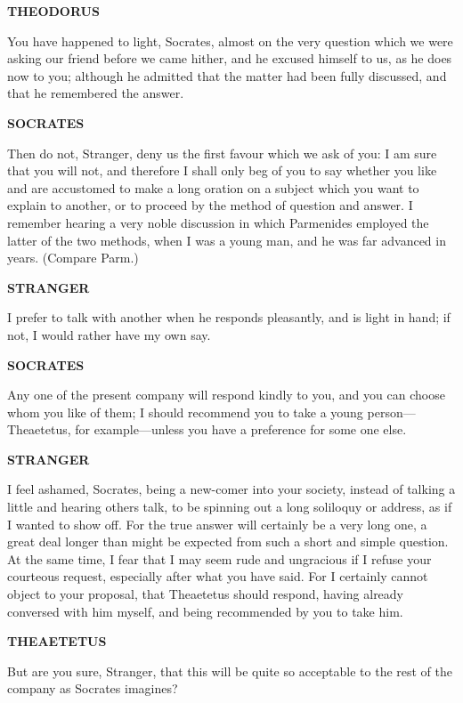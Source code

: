 \documentclass[11pt,letter]{article}
\begin{document}
\par \textbf{THEODORUS}
\par   You have happened to light, Socrates, almost on the very question which we were asking our friend before we came hither, and he excused himself to us, as he does now to you; although he admitted that the matter had been fully discussed, and that he remembered the answer.

\par \textbf{SOCRATES}
\par   Then do not, Stranger, deny us the first favour which we ask of you:  I am sure that you will not, and therefore I shall only beg of you to say whether you like and are accustomed to make a long oration on a subject which you want to explain to another, or to proceed by the method of question and answer. I remember hearing a very noble discussion in which Parmenides employed the latter of the two methods, when I was a young man, and he was far advanced in years. (Compare Parm.)

\par \textbf{STRANGER}
\par   I prefer to talk with another when he responds pleasantly, and is light in hand; if not, I would rather have my own say.

\par \textbf{SOCRATES}
\par   Any one of the present company will respond kindly to you, and you can choose whom you like of them; I should recommend you to take a young person—Theaetetus, for example—unless you have a preference for some one else.

\par \textbf{STRANGER}
\par   I feel ashamed, Socrates, being a new-comer into your society, instead of talking a little and hearing others talk, to be spinning out a long soliloquy or address, as if I wanted to show off. For the true answer will certainly be a very long one, a great deal longer than might be expected from such a short and simple question. At the same time, I fear that I may seem rude and ungracious if I refuse your courteous request, especially after what you have said. For I certainly cannot object to your proposal, that Theaetetus should respond, having already conversed with him myself, and being recommended by you to take him.

\par \textbf{THEAETETUS}
\par   But are you sure, Stranger, that this will be quite so acceptable to the rest of the company as Socrates imagines?
\end{document}
